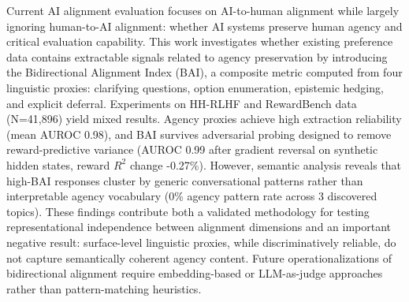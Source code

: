 
Current AI alignment evaluation focuses on AI-to-human alignment while largely ignoring human-to-AI alignment: whether AI systems preserve human agency and critical evaluation capability. This work investigates whether existing preference data contains extractable signals related to agency preservation by introducing the Bidirectional Alignment Index (BAI), a composite metric computed from four linguistic proxies: clarifying questions, option enumeration, epistemic hedging, and explicit deferral. Experiments on HH-RLHF and RewardBench data (N=41,896) yield mixed results. Agency proxies achieve high extraction reliability (mean AUROC 0.98), and BAI survives adversarial probing designed to remove reward-predictive variance (AUROC 0.99 after gradient reversal on synthetic hidden states, reward $R^2$ change -0.27\%). However, semantic analysis reveals that high-BAI responses cluster by generic conversational patterns rather than interpretable agency vocabulary (0\% agency pattern rate across 3 discovered topics). These findings contribute both a validated methodology for testing representational independence between alignment dimensions and an important negative result: surface-level linguistic proxies, while discriminatively reliable, do not capture semantically coherent agency content. Future operationalizations of bidirectional alignment require embedding-based or LLM-as-judge approaches rather than pattern-matching heuristics.
